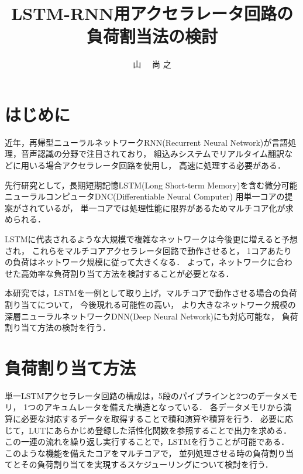 \documentclass[a4j]{jarticle}
\title{LSTM-RNN用アクセラレータ回路の負荷割当法の検討}
\author{山 \UTF{FA11} ~~尚 之}
\begin{document}
\begin{Abstract}

 \section{はじめに}

近年，再帰型ニューラルネットワークRNN(Recurrent Neural Network)が言語処理，音声認識の分野で注目されており，
組込みシステムでリアルタイム翻訳などに用いる場合アクセラレータ回路を使用し，
高速に処理する必要がある．

先行研究として，長期短期記憶LSTM(Long Short-term Memory)を含む微分可能ニューラルコンピュータDNC(Differentiable Neural Computer)
用単一コアの提案\cite{bib:pre-method}がされているが，
単一コアでは処理性能に限界があるためマルチコア化が求められる．

LSTMに代表されるような大規模で複雑なネットワークは今後更に増えると予想され，
これらをマルチコアアクセラレータ回路で動作させると，
1コアあたりの負荷はネットワーク規模に従って大きくなる．
よって，ネットワークに合わせた高効率な負荷割り当て方法を検討することが必要となる．

本研究では，LSTMを一例として取り上げ，マルチコアで動作させる場合の負荷割り当てについて，
今後現れる可能性の高い，
より大きなネットワーク規模の深層ニューラルネットワークDNN(Deep Neural Network)にも対応可能な，
負荷割り当て方法の検討を行う．


 \section{負荷割り当て方法}
単一LSTMアクセラレータ回路の構成は，5段のパイプラインと2つのデータメモリ，
1つのアキュムレータを備えた構造となっている．
各データメモリから演算に必要な対応するデータを取得することで積和演算や積算を行う．
必要に応じて，LUTにあらかじめ登録した活性化関数を参照することで出力を求める．
この一連の流れを繰り返し実行することで，LSTMを行うことが可能である．
このような機能を備えたコアをマルチコアで，
並列処理させる時の負荷割り当てとその負荷割り当てを実現するスケジューリングについて検討を行う．


\end{Abstract}
\end{document}
